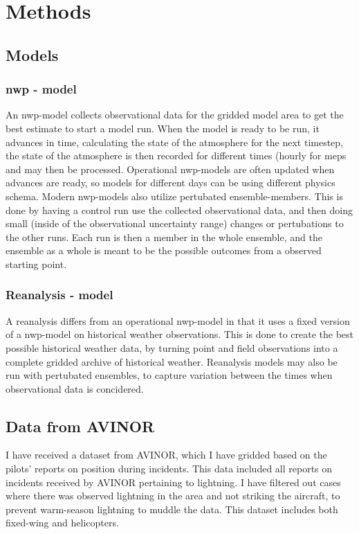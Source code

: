 \setcounter{chapter}{2}
\chapter{Methods}

\section{Models}

\subsection{\acrfull{nwp} - model}
An \acrshort{nwp}-model collects observational data for the gridded model area to get the best estimate to start a model run. When the model is ready to be run, it advances in time, calculating the state of the atmosphere for the next timestep, the state of the atmosphere is then recorded for different times (hourly for \acrshort{meps} and may then be processed. Operational \acrshort{nwp}-models are often updated when advances are ready, so models for different days can be using different physics schema. Modern \acrshort{nwp}-models also utilize pertubated ensemble-members. This is done by having a control run use the collected observational data, and then doing small (inside of the observational uncertainty range) changes or pertubations to the other runs. Each run is then a member in the whole ensemble, and the ensemble as a whole is meant to be the possible outcomes from a observed starting point.

\subsection{Reanalysis - model}
A reanalysis differs from an operational \acrshort{nwp}-model in that it uses a fixed version of a \acrshort{nwp}-model on historical weather observations. This is done to create the best possible historical weather data, by turning point and field observations into a complete gridded archive of historical weather. Reanalysis models may also be run with pertubated ensembles, to capture variation between the times when observational data is concidered.

\section{Data from AVINOR}
I have received a dataset from AVINOR, which I have gridded based on the pilots’ reports on position during incidents. This data included all reports on incidents received by AVINOR pertaining to lightning. I have filtered out cases where there was observed lightning in the area and not striking the aircraft, to prevent warm-season lightning to muddle the data. This dataset includes both fixed-wing and helicopters. 

